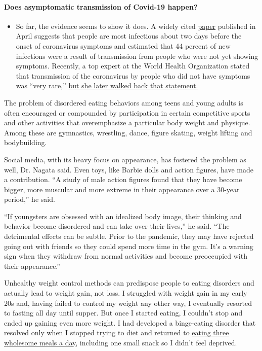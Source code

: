 \begin{itemize}
{  \paragraph{Does asymptomatic transmission of Covid-19
  happen?}\label{does-asymptomatic-transmission-of-covid-19-happen}}

  \begin{itemize}
  \tightlist
  \item
    So far, the evidence seems to show it does. A widely cited
    \href{https://www.nature.com/articles/s41591-020-0869-5}{paper}
    published in April suggests that people are most infectious about
    two days before the onset of coronavirus symptoms and estimated that
    44 percent of new infections were a result of transmission from
    people who were not yet showing symptoms. Recently, a top expert at
    the World Health Organization stated that transmission of the
    coronavirus by people who did not have symptoms was ``very rare,''
    \href{https://www.nytimes3xbfgragh.onion/2020/06/09/world/coronavirus-updates.html?action=click\&pgtype=Article\&state=default\&region=MAIN_CONTENT_3\&context=storylines_faq\#link-1f302e21}{but
    she later walked back that statement.}
  \end{itemize}
\end{itemize}

The problem of disordered eating behaviors among teens and young adults
is often encouraged or compounded by participation in certain
competitive sports and other activities that overemphasize a particular
body weight and physique. Among these are gymnastics, wrestling, dance,
figure skating, weight lifting and bodybuilding.

Social media, with its heavy focus on appearance, has fostered the
problem as well, Dr. Nagata said. Even toys, like Barbie dolls and
action figures, have made a contribution. ``A study of male action
figures found that they have become bigger, more muscular and more
extreme in their appearance over a 30-year period,'' he said.

``If youngsters are obsessed with an idealized body image, their
thinking and behavior become disordered and can take over their lives,''
he said. ``The detrimental effects can be subtle. Prior to the pandemic,
they may have rejected going out with friends so they could spend more
time in the gym. It's a warning sign when they withdraw from normal
activities and become preoccupied with their appearance.''

Unhealthy weight control methods can predispose people to eating
disorders and actually lead to weight gain, not loss. I struggled with
weight gain in my early 20s and, having failed to control my weight any
other way, I eventually resorted to fasting all day until supper. But
once I started eating, I couldn't stop and ended up gaining even more
weight. I had developed a binge-eating disorder that resolved only when
I stopped trying to diet and returned to
\href{https://www.nytimes3xbfgragh.onion/2018/03/05/well/jane-brodys-personal-secrets-to-lasting-weight-loss.html}{eating
three wholesome meals a day}, including one small snack so I didn't feel
deprived.

